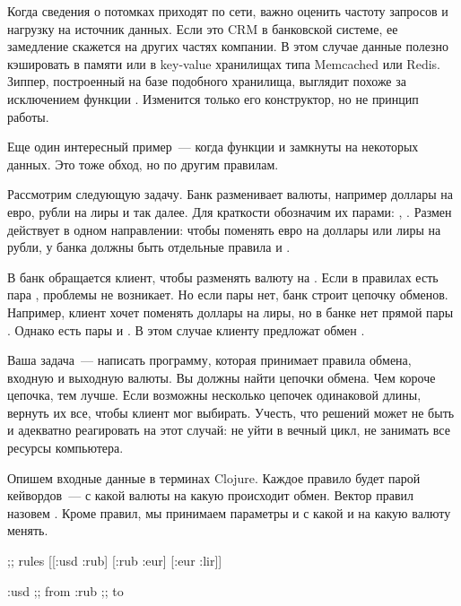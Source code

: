 Когда сведения о потомках приходят по сети, важно оценить частоту запросов и
нагрузку на источник данных. Если это CRM в банковской системе, ее замедление
скажется на других частях компании. В этом случае данные полезно кэшировать в
памяти или в key-value хранилищах типа Memcached или Redis. Зиппер, построенный
на базе подобного хранилища, выглядит похоже за исключением функции
. Изменится только его конструктор, но не принцип работы.

Еще один интересный пример~--- когда функции  и  замкнуты на
некоторых данных. Это тоже обход, но по другим правилам.

Рассмотрим следующую задачу. Банк разменивает валюты, например доллары на евро,
рубли на лиры и так далее. Для краткости обозначим их парами: ,
. Размен действует в одном направлении: чтобы поменять евро на
доллары или лиры на рубли, у банка должны быть отдельные правила  и
.

В банк обращается клиент, чтобы разменять валюту  на . Если в правилах
есть пара , проблемы не возникает. Но если пары нет, банк строит цепочку
обменов. Например, клиент хочет поменять доллары на лиры, но в банке нет прямой
пары . Однако есть пары  и . В этом случае
клиенту предложат обмен  \arr {} \arr {}.

Ваша задача~--- написать программу, которая принимает правила обмена, входную и
выходную валюты. Вы должны найти цепочки обмена. Чем короче цепочка, тем
лучше. Если возможны несколько цепочек одинаковой длины, вернуть их все, чтобы
клиент мог выбирать. Учесть, что решений может не быть и адекватно реагировать
на этот случай: не уйти в вечный цикл, не занимать все ресурсы компьютера.

Опишем входные данные в терминах Clojure. Каждое правило будет парой кейвордов~---
с какой валюты на какую происходит обмен. Вектор правил назовем . Кроме
правил, мы принимаем параметры  и  с какой и на какую валюту менять.

\begin{english}
  \begin{clojure}
;; rules
[[:usd :rub] [:rub :eur] [:eur :lir]]

:usd ;; from
:rub ;; to
  \end{clojure}
\end{english}

